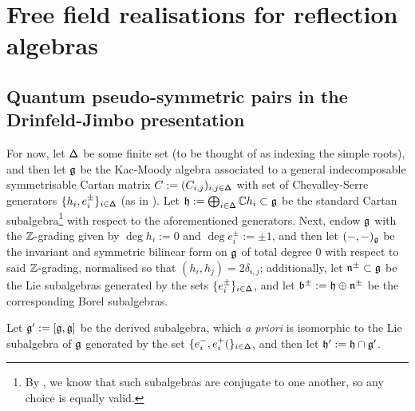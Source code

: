 \section{Free field realisations for reflection algebras}
    \subsection{Quantum pseudo-symmetric pairs in the Drinfeld-Jimbo presentation}
        For now, let $\mathsf{\Delta}$ be some finite set (to be thought of as indexing the simple roots), and then let $\mathfrak{g}$ be the Kac-Moody algebra associated to a general indecomposable symmetrisable Cartan matrix $C := (C_{i, j})_{i, j \in \mathsf{\Delta}}$ with set of Chevalley-Serre generators $\{h_i, e_i^{\pm}\}_{i \in \mathsf{\Delta}}$ (as in \cite[Chapter 1]{kac_infinite_dimensional_lie_algebras}). Let $\mathfrak{h} := \bigoplus_{i \in \mathsf{\Delta}} \mathbb{C} h_i \subset \mathfrak{g}$ be the standard Cartan subalgebra\footnote{By \cite{kac_peterson_infinite_flag_varieties_and_conjugacy_of_cartan_subalgebras}, we know that such subalgebras are conjugate to one another, so any choice is equally valid.} with respect to the aforementioned generators. Next, endow $\mathfrak{g}$ with the $\mathbb{Z}$-grading given by $\deg h_i := 0$ and $\deg e_i^{\pm} := \pm 1$, and then let $(-, -)_{\mathfrak{g}}$ be the invariant and symmetric bilinear form on $\mathfrak{g}$ of total degree $0$ with respect to said $\mathbb{Z}$-grading, normalised so that $(h_i, h_j) = 2\delta_{i, j}$; additionally, let $\mathfrak{n}^{\pm} \subset \mathfrak{g}$ be the Lie subalgebras generated by the sets $\{e_i^{\pm}\}_{i \in \mathsf{\Delta}}$, and let $\mathfrak{b}^{\pm} := \mathfrak{h} \oplus \mathfrak{n}^{\pm}$ be the corresponding Borel subalgebras.
        
        Let $\mathfrak{g}' := [\mathfrak{g}, \mathfrak{g}]$ be the derived subalgebra, which \textit{a priori} is isomorphic to the Lie subalgebra of $\mathfrak{g}$ generated by the set $\{e_i^-, e_i^+(\}_{i \in \mathsf{\Delta}}$, and then let $\mathfrak{h}' := \mathfrak{h} \cap \mathfrak{g}'$. 

